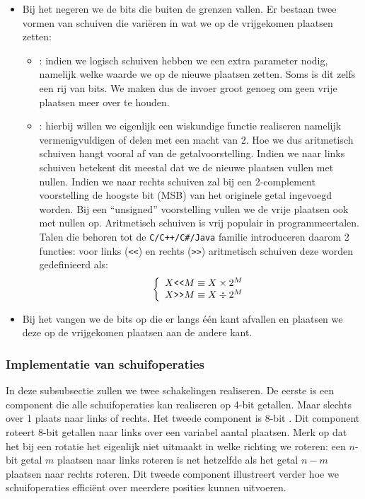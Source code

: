 \begin{itemize}
 \item Bij het  negeren we de bits die buiten de grenzen vallen. Er bestaan twee vormen van schuiven die vari\"eren in wat we op de vrijgekomen plaatsen zetten:
 \begin{itemize}
   \item {}: indien we logisch schuiven hebben we een extra parameter nodig, namelijk welke waarde we op de nieuwe plaatsen zetten. Soms is dit zelfs een rij van bits. We maken dus de invoer groot genoeg om geen vrije plaatsen meer over te houden.
   \item {}: hierbij willen we eigenlijk een wiskundige functie realiseren namelijk vermenigvuldigen of delen met een macht van 2. Hoe we dus aritmetisch schuiven hangt vooral af van de getalvoorstelling. Indien we naar links schuiven betekent dit meestal dat we de nieuwe plaatsen vullen met nullen. Indien we naar rechts schuiven zal bij een 2-complement voorstelling de hoogste bit (MSB) van het originele getal ingevoegd worden. Bij een ``unsigned'' voorstelling vullen we de vrije plaatsen ook met nullen op. Aritmetisch schuiven is vrij populair in programmeertalen. Talen die behoren tot de \verb|C/C++/C#/Java| familie introduceren daarom 2 functies: voor links (\verb+<<+) en rechts (\verb+>>+) aritmetisch schuiven deze worden gedefinieerd als:
\begin{equation}
\left\{\begin{array}{l}
X\verb+<<+M\equiv X\times 2^M\\
X\verb+>>+M\equiv X\div 2^M
\end{array}\right.
\end{equation}
 \end{itemize}
 \item Bij het  vangen we de bits op die er langs \'e\'en kant afvallen en plaatsen we deze op de vrijgekomen plaatsen aan de andere kant.
\end{itemize}
\subsubsection{Implementatie van schuifoperaties}
In deze subsubsectie zullen we twee schakelingen realiseren. De eerste is een component die alle schuifoperaties kan realiseren op 4-bit getallen. Maar slechts over 1 plaats naar links of rechts. Het tweede component is 8-bit . Dit component roteert 8-bit getallen naar links over een variabel aantal plaatsen. Merk op dat het bij een rotatie het eigenlijk niet uitmaakt in welke richting we roteren: een $n$-bit getal $m$ plaatsen naar links roteren is net hetzelfde als het getal $n-m$ plaatsen naar rechts roteren. Dit tweede component illustreert verder hoe we schuifoperaties effici\"ent over meerdere posities kunnen uitvoeren.
